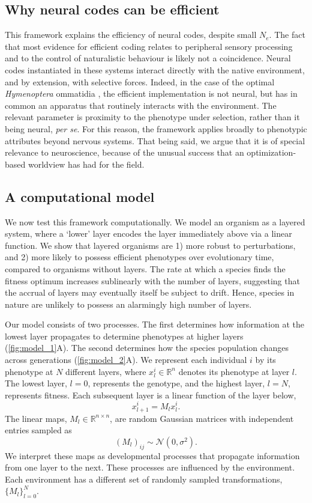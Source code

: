 \documentclass[twocolumn]{article}
\begin{document}
\subsection{Why neural codes can be efficient}

This framework explains the efficiency of neural codes, despite small $N_e$. The fact that most evidence for efficient coding relates to peripheral sensory processing and to the control of naturalistic behaviour is likely not a coincidence. Neural codes instantiated in these systems interact directly with the native environment, and by extension, with selective forces. Indeed, in the case of the optimal \textit{Hymenoptera} ommatidia \cite{barlow_1952}, the efficient implementation is not neural, but has in common an apparatus that routinely interacts with the environment. The relevant parameter is proximity to the phenotype under selection, rather than it being neural, \textit{per se}. For this reason, the framework applies broadly to phenotypic attributes beyond nervous systems. That being said, we argue that it is of special relevance to neuroscience, because of the unusual success that an optimization-based worldview has had for the field.

\subsection{A computational model}

We now test this framework computationally. We model an organism as a layered system, where a `lower' layer encodes the layer immediately above via a linear function. We show that layered organisms are 1) more robust to perturbations, and 2) more likely to possess efficient phenotypes over evolutionary time, compared to organisms without layers. The rate at which a species finds the fitness optimum increases sublinearly with the number of layers, suggesting that the accrual of layers may eventually itself be subject to drift. Hence, species in nature are unlikely to possess an alarmingly high number of layers.

Our model consists of two processes. The first determines how information at the lowest layer propagates to determine phenotypes at higher layers (\autoref{fig:model_1}A). The second determines how the species population changes across generations (\autoref{fig:model_2}A). We represent each individual $i$ by its phenotype at $N$ different layers, where $x_l^i \in \mathbb{R}^n$ denotes its phenotype at layer $l$. The lowest layer, $l=0$, represents the genotype, and the highest layer, $l=N$, represents fitness. Each subsequent layer is a linear function of the layer below,
\[ x_{l+1}^i = M_{l}x_l^{i}.\]
The linear maps, $M_l \in \mathbb{R}^{n \times n}$, are random Gaussian matrices with independent entries sampled as
\[
(M_l)_{ij} \sim \mathcal{N}(0, \sigma^2).
\]
We interpret these maps as developmental processes that propagate information from one layer to the next. These processes are influenced by the environment. Each environment has a different set of randomly sampled transformations, $\{M_l\}_{l=0}^N$.
\end{document}
